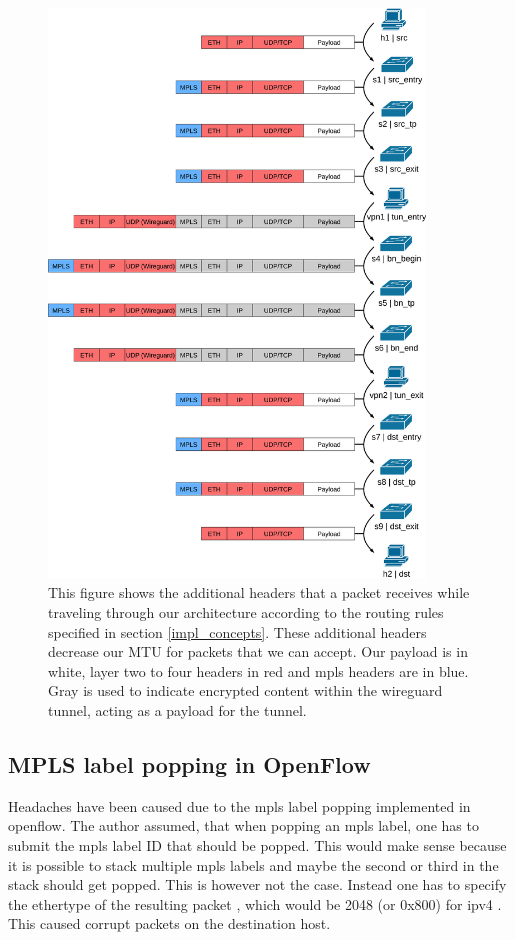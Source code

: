\begin{figure}[hp]
    \centering
    \includegraphics[width=10cm]{images/chapter_6/packet_structure.png}
    \caption[Additional headers of packets]{This figure shows the additional headers that a packet receives while traveling through our architecture according to the routing rules specified in section \ref{impl_concepts}. These additional headers decrease our MTU for packets that we can accept. Our payload is in white, layer two to four headers in red and \acrshort{mpls} headers are in blue. Gray is used to indicate encrypted content within the \gls{wireguard} tunnel, acting as a payload for the tunnel.}
    \label{fig:packet_structure}
\end{figure}

\subsection{MPLS label popping in OpenFlow}
Headaches have been caused due to the \acrshort{mpls} label popping implemented in \Gls{openflow}. The author assumed, that when popping an \acrshort{mpls} label, one has to submit the \acrshort{mpls} label ID that should be popped. This would make sense because it is possible to stack multiple \acrshort{mpls} labels and maybe the second or third in the stack should get popped. This is however not the case. Instead one has to specify the \gls{ethertype} of the resulting packet \cite{openflow}, which would be 2048 (or 0x800) for \acrshort{ipv4} \cite{rfc7042}. This caused corrupt packets on the destination host.

